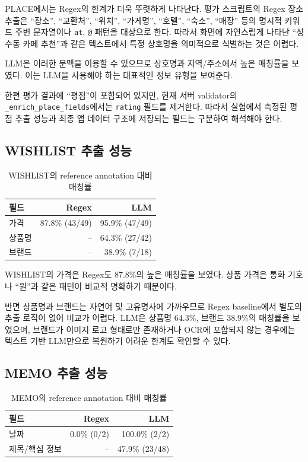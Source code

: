 \documentclass[11pt,a4paper]{article}
\begin{document}
PLACE에서는 Regex의 한계가 더욱 뚜렷하게 나타난다. 평가 스크립트의 Regex 장소 추출은 ``장소'', ``교환처'', ``위치'', ``가게명'', ``호텔'', ``숙소'', ``매장'' 등의 명시적 키워드 주변 문자열이나 \texttt{at}, \texttt{@} 패턴을 대상으로 한다. 따라서 화면에 자연스럽게 나타난 ``성수동 카페 추천''과 같은 텍스트에서 특정 상호명을 의미적으로 식별하는 것은 어렵다.

LLM은 이러한 문맥을 이용할 수 있으므로 상호명과 지역/주소에서 높은 매칭률을 보였다. 이는 LLM을 사용해야 하는 대표적인 정보 유형을 보여준다.

한편 평가 결과에 ``평점''이 포함되어 있지만, 현재 서버 validator의 \texttt{\_enrich\_place\_fields}에서는 \texttt{rating} 필드를 제거한다. 따라서 실험에서 측정된 평점 추출 성능과 최종 앱 데이터 구조에 저장되는 필드는 구분하여 해석해야 한다.

\subsection{WISHLIST 추출 성능}

\begin{table}[H]
\centering
\small
\begin{tabularx}{0.92\linewidth}{l r r}
\toprule
\textbf{필드} & \textbf{Regex} & \textbf{LLM}\\
\midrule
가격 & 87.8\% (43/49) & 95.9\% (47/49)\\
상품명 & -- & 64.3\% (27/42)\\
브랜드 & -- & 38.9\% (7/18)\\
\bottomrule
\end{tabularx}
\caption{WISHLIST의 reference annotation 대비 매칭률}
\end{table}

WISHLIST의 가격은 Regex도 87.8\%의 높은 매칭률을 보였다. 상품 가격은 통화 기호나 ``원''과 같은 패턴이 비교적 명확하기 때문이다.

반면 상품명과 브랜드는 자연어 및 고유명사에 가까우므로 Regex baseline에서 별도의 추출 로직이 없어 비교가 어렵다. LLM은 상품명 64.3\%, 브랜드 38.9\%의 매칭률을 보였으며, 브랜드가 이미지 로고 형태로만 존재하거나 OCR에 포함되지 않는 경우에는 텍스트 기반 LLM만으로 복원하기 어려운 한계도 확인할 수 있다.

\subsection{MEMO 추출 성능}

\begin{table}[H]
\centering
\small
\begin{tabularx}{0.92\linewidth}{l r r}
\toprule
\textbf{필드} & \textbf{Regex} & \textbf{LLM}\\
\midrule
날짜 & 0.0\% (0/2) & 100.0\% (2/2)\\
제목/핵심 정보 & -- & 47.9\% (23/48)\\
\bottomrule
\end{tabularx}
\caption{MEMO의 reference annotation 대비 매칭률}
\end{table}
\end{document}
